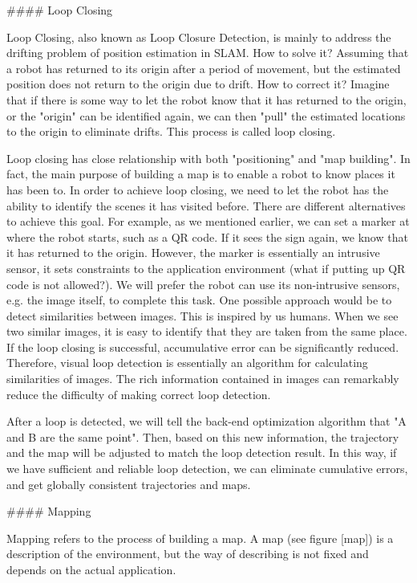 #### Loop Closing

Loop Closing, also known as Loop Closure Detection, is mainly to address the drifting problem of position estimation in SLAM. How to solve it? Assuming that a robot has returned to its origin after a period of movement, but the estimated position does not return to the origin due to drift. How to correct it? Imagine that if there is some way to let the robot know that it has returned to the origin, or the "origin" can be identified again, we can then "pull" the estimated locations to the origin to eliminate drifts. This process is called loop closing.

Loop closing has close relationship with both "positioning" and "map building". In fact, the main purpose of building a map is to enable a robot to know places it has been to. In order to achieve loop closing, we need to let the robot has the ability to identify the scenes it has visited before. There are different alternatives to achieve this goal. For example, as we mentioned earlier, we can set a marker at where the robot starts, such as a QR code. If it sees the sign again, we know that it has returned to the origin. However, the marker is essentially an intrusive sensor, it sets constraints to the application environment (what if putting up QR code is not allowed?). We will prefer the robot can use its non-intrusive sensors, e.g. the image itself, to complete this task. One possible approach would be to detect similarities between images. This is inspired by us humans. When we see two similar images, it is easy to identify that they are taken from the same place. If the loop closing is successful, accumulative error can be significantly reduced. Therefore, visual loop detection is essentially an algorithm for calculating similarities of images. The rich information contained in images can remarkably reduce the difficulty of making correct loop detection.

After a loop is detected, we will tell the back-end optimization algorithm that "A and B are the same point". Then, based on this new information, the trajectory and the map will be adjusted to match the loop detection result. In this way, if we have sufficient and reliable loop detection, we can eliminate cumulative errors, and get globally consistent trajectories and maps.

#### Mapping

Mapping refers to the process of building a map. A map (see figure [map]) is a description of the environment, but the way of describing is not fixed and depends on the actual application.

